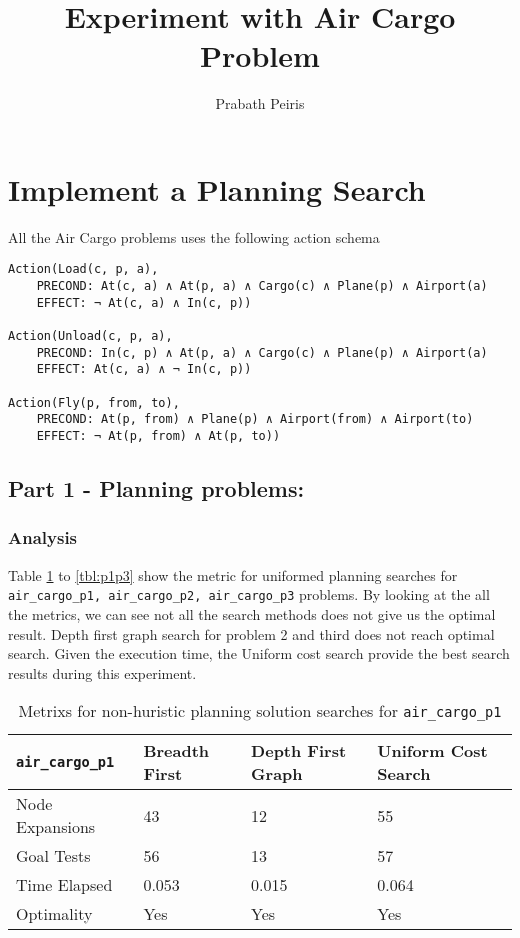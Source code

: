 \documentclass{article}
\begin{document}
\author{Prabath Peiris}
\date{}
\title{Experiment with Air Cargo Problem}
\maketitle

\section*{Implement a Planning Search}


All the Air Cargo problems uses the following action schema

\begin{verbatim}
Action(Load(c, p, a),
	PRECOND: At(c, a) ∧ At(p, a) ∧ Cargo(c) ∧ Plane(p) ∧ Airport(a)
	EFFECT: ¬ At(c, a) ∧ In(c, p))

Action(Unload(c, p, a),
	PRECOND: In(c, p) ∧ At(p, a) ∧ Cargo(c) ∧ Plane(p) ∧ Airport(a)
	EFFECT: At(c, a) ∧ ¬ In(c, p))

Action(Fly(p, from, to),
	PRECOND: At(p, from) ∧ Plane(p) ∧ Airport(from) ∧ Airport(to)
	EFFECT: ¬ At(p, from) ∧ At(p, to))
\end{verbatim}

\subsection*{Part 1 - Planning problems:}

\subsubsection*{Analysis}

Table \ref{tbl:p1p1} to \ref{tbl:p1p3} show the metric for uniformed planning searches for {\tt air\_cargo\_p1, air\_cargo\_p2, air\_cargo\_p3} problems. By looking at the all the metrics, we can see not all the search methods does not give us the optimal result. Depth first graph search for problem 2 and third does not reach optimal search. Given the execution time, the Uniform cost search provide the best search results during this experiment.


\begin{table}[h]
\begin{center}
\begin{tabular}{|l|l|l|l|}
\hline
{\tt air\_cargo\_p1} & Breadth First & Depth First Graph& Uniform Cost Search \\ \hline\hline
Node Expansions& 43 & 12 & 55\\ 
Goal Tests & 56 & 13 & 57\\ 
Time Elapsed& 0.053 & 0.015 & 0.064\\ 
Optimality & Yes & Yes & Yes\\ \hline
\end{tabular}
\end{center}
\caption{Metrixs for non-huristic planning solution searches for {\tt air\_cargo\_p1}}
\label{tbl:p1p1}
\end{table}
\end{document}
